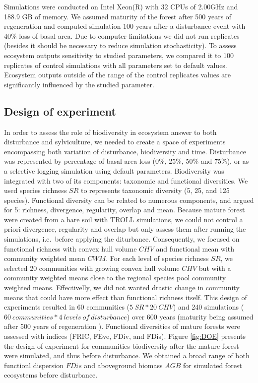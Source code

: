 \documentclass[12pt,]{article}
\theoremstyle{definition}
\theoremstyle{definition}
\theoremstyle{remark}
\begin{document}
Simulations were conducted on Intel Xeon(R) with 32 CPUs of 2.00GHz and
188.9 GB of memory. We assumed maturity of the forest after 500 years of
regeneration \citet{Li} and computed simulation 100 years after a
disturbance event with 40\% loss of basal area. Due to computer
limitations we did not run replicates (besides it should be necessary to
reduce simulation stochasticity). To assess ecosystem outputs
sensitivity to studied parameters, we compared it to 100 replicates of
control simulations with all parameters set to default values. Ecosystem
outputs outside of the range of the control replicates values are
significantly influenced by the studied parameter.

\subsection{Design of experiment}\label{design-of-experiment}

In order to assess the role of biodiversity in ecosystem answer to both
disturbance and sylviculture, we needed to create a space of experiments
encompassing both variation of disturbance, biodiversity and time.
Disturbance was represented by percentage of basal area loss (0\%, 25\%,
50\% and 75\%), or as a selective logging simulation using default
parameters. Biodiversity was integrated with two of its components:
taxonomic and functional diversities. We used species richness \(SR\) to
represents taxonomic diversity (5, 25, and 125 species). Functional
diversity can be related to numerous components, and \citet{Borgy2017}
argued for 5: richness, divergence, regularity, overlap and mean.
Because mature forest were created from a bare soil with TROLL
simulations, we could not control a priori divergence, regularity and
overlap but only assess them after running the simulations, i.e.~before
applying the diturbance. Consequently, we focused on functional richness
with convex hull volume \(CHV\) and functional mean with community
weighted mean \(CWM\). For each level of species richness \(SR\), we
selected 20 communities with growing convex hull volume \(CHV\) but with
a community weighted means close to the regional species pool community
weighted means. Effectivelly, we did not wanted drastic change in
community means that could have more effect than functional richness
itself. This design of experiments resulted in 60 communities
(\(5~SR*20~CHV\)) and 240 simulations
(\(60 ~communities*4~levels~of~disturbance\)) over 600 years (maturity
being assumed after 500 years of regeneration \citep{Li}). Functional
diversities of mature forests were assessed with
\citet{villeger_new_2008} indices (FRIC, FEve, FDiv, and FDis). Figure
\ref{fig:DOE} presents the design of experiment for communities
biodiversity after the mature forest were simulated, and thus before
disturbance. We obtained a broad range of both functionl dispersion
\(FDis\) and aboveground biomass \(AGB\) for simulated forest ecosystems
before disturbance.
\end{document}
